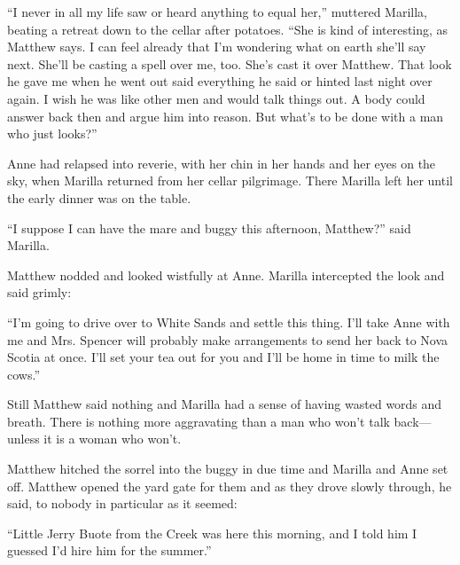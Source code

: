 \documentclass[a4paper]{article}
\begin{document}
\small{``I never in all my life saw or heard anything to equal her,'' muttered Marilla, beating a retreat down to the cellar after potatoes. ``She is kind of interesting, as Matthew says. I can feel already that I'm wondering what on earth she'll say next. She'll be casting a spell over me, too. She's cast it over Matthew. That look he gave me when he went out said everything he said or hinted last night over again. I wish he was like other men and would talk things out. A body could answer back then and argue him into reason. But what's to be done with a man who just looks?''

Anne had relapsed into reverie, with her chin in her hands and her eyes on the sky, when Marilla returned from her cellar pilgrimage. There Marilla left her until the early dinner was on the table.

``I suppose I can have the mare and buggy this afternoon, Matthew?'' said Marilla.

Matthew nodded and looked wistfully at Anne. Marilla intercepted the look and said grimly:}

\normalsize{``I'm going to drive over to White Sands and settle this thing. I'll take Anne with me and Mrs. Spencer will probably make arrangements to send her back to Nova Scotia at once. I'll set your tea out for you and I'll be home in time to milk the cows.''

Still Matthew said nothing and Marilla had a sense of having wasted words and breath. There is nothing more aggravating than a man who won't talk back---unless it is a woman who won't.

Matthew hitched the sorrel into the buggy in due time and Marilla and Anne set off. Matthew opened the yard gate for them and as they drove slowly through, he said, to nobody in particular as it seemed:

``Little Jerry Buote from the Creek was here this morning, and I told him I guessed I'd hire him for the summer.''}
\end{document}
